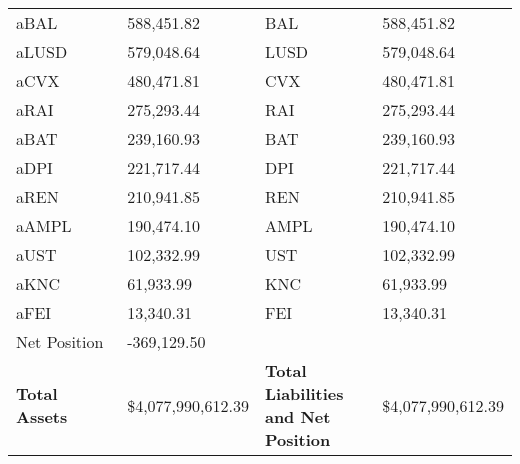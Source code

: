 \begin{longtable}{@{}p{0.25\linewidth}p{0.25\linewidth}p{0.25\linewidth}p{0.25\linewidth}@{}}
aBAL & 588,451.82 & BAL &588,451.82 \\
aLUSD & 579,048.64 & LUSD &579,048.64 \\
aCVX & 480,471.81 & CVX &480,471.81 \\
aRAI & 275,293.44 & RAI &275,293.44 \\
aBAT & 239,160.93 & BAT &239,160.93 \\
aDPI & 221,717.44 & DPI &221,717.44 \\
aREN & 210,941.85 & REN &210,941.85 \\
aAMPL & 190,474.10 & AMPL &190,474.10 \\
aUST & 102,332.99 & UST &102,332.99 \\
aKNC & 61,933.99 & KNC &61,933.99 \\
aFEI & 13,340.31 & FEI &13,340.31 \\
Net Position & -369,129.50 & & \\

\midrule

\textbf{Total Assets} & \$4,077,990,612.39 & \textbf{Total Liabilities and Net Position} & \$4,077,990,612.39 \\

\bottomrule

\end{longtable}
